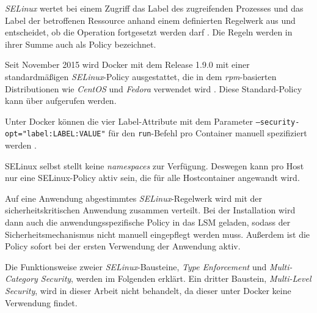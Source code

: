 \documentclass[../main.tex]{subfiles}
\begin{document}
				\emph{SELinux} wertet bei einem Zugriff das Label des zugreifenden Prozesses und das Label der betroffenen Ressource anhand einem definierten Regelwerk aus und entscheidet, ob die Operation fortgesetzt werden darf \cite{linuxSecOverview}. Die Regeln werden in ihrer Summe auch als Policy bezeichnet.

				Seit November 2015 wird Docker mit dem Release 1.9.0 mit einer standardmäßigen \emph{SELinux}-Policy ausgestattet, die in dem \emph{rpm}-basierten Distributionen wie \emph{CentOS} und \emph{Fedora} verwendet wird \cite{githubDockerChangelog}\cite{githubSELinuxPolicyIssue}. Diese Standard-Policy kann über \cite{githubSELinuxProfile} aufgerufen werden.

				Unter Docker können die vier Label-Attribute mit dem Parameter \texttt{--security-opt="label:LABEL:VALUE"} für den \texttt{run}-Befehl pro Container manuell spezifiziert werden \cite{dockerRun}.


				SELinux selbst stellt keine \emph{namespaces} zur Verfügung. Deswegen kann pro Host nur eine SELinux-Policy aktiv sein, die für alle Hostcontainer angewandt wird.

				Auf eine Anwendung abgestimmtes \emph{SELinux}-Regelwerk wird mit der sicherheitskritischen Anwendung zusammen verteilt. Bei der Installation wird dann auch die anwendungsspezifische Policy in das LSM geladen, sodass der Sicherheitsmechanismus nicht manuell eingepflegt werden muss. Außerdem ist die Policy sofort bei der ersten Verwendung der Anwendung aktiv.

				Die Funktionsweise zweier \emph{SELinux}-Bausteine, \emph{Type Enforcement} und \emph{Multi-Category Security}, werden im Folgenden erklärt. Ein dritter Baustein, \emph{Multi-Level Security}, wird in dieser Arbeit nicht behandelt, da dieser unter Docker keine Verwendung findet.


\end{document}
